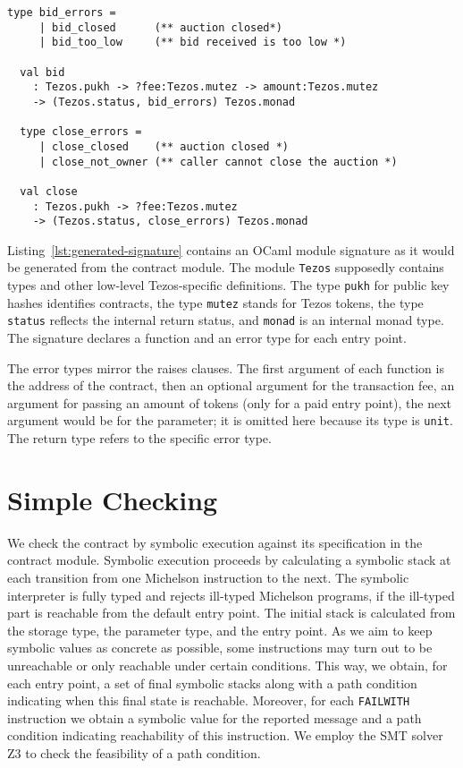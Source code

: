 \documentclass[a4paper,USenglish,american,cleveref, autoref, thm-restate]{oasics-v2021}
\begin{document}
\begin{lstlisting}[float,captionpos=b,caption={Generated signature},label={lst:generated-signature}]
  type bid_errors = 
     | bid_closed      (** auction closed*)
     | bid_too_low     (** bid received is too low *)

  val bid
    : Tezos.pukh -> ?fee:Tezos.mutez -> amount:Tezos.mutez
    -> (Tezos.status, bid_errors) Tezos.monad

  type close_errors = 
     | close_closed    (** auction closed *)
     | close_not_owner (** caller cannot close the auction *)

  val close
    : Tezos.pukh -> ?fee:Tezos.mutez
    -> (Tezos.status, close_errors) Tezos.monad
\end{lstlisting}
Listing~\ref{lst:generated-signature} contains an OCaml module
signature as it would be generated from the contract module. The
module \lstinline/Tezos/ supposedly contains types and other low-level
Tezos-specific definitions. The type \lstinline/pukh/ for public
key hashes identifies contracts, the type \lstinline/mutez/ stands for
Tezos tokens, the type \lstinline/status/ reflects the internal return
status, and \lstinline/monad/ is an internal monad type. The signature
declares a function and an error type for each entry point.

The error types mirror the raises clauses. The first argument of each
function is the address of the contract, then an optional argument for
the transaction fee, an argument for passing an amount of tokens
(only for a paid entry point), the next argument would be for
the parameter; it is omitted here because its type is
\lstinline/unit/. The return type refers to the specific error type.

\section{Simple Checking}
\label{sec:check-contr-against}

We check the contract by symbolic execution against its
specification in the contract module. Symbolic execution proceeds by calculating a symbolic stack at
each transition from 
one Michelson instruction to the next. The symbolic interpreter is fully typed and rejects ill-typed
Michelson programs, if the ill-typed part is reachable from the default entry point. The initial
stack is calculated 
from the storage type, the parameter type, and the entry point.
As we aim to keep symbolic
values as concrete as possible, some instructions may turn out to be
unreachable or only reachable under certain conditions. This way, we
obtain, for each entry point, a set of final symbolic stacks along with
a path condition indicating when this final state is
reachable. Moreover, for each \lstinline/FAILWITH/ instruction we
obtain a symbolic value for the reported message and a path condition
indicating reachability of this instruction. We employ the SMT solver
Z3 \cite{DBLP:conf/tacas/MouraB08,DBLP:conf/setss/BjornerMNW18} to
check the feasibility of a path condition. 
\end{document}

